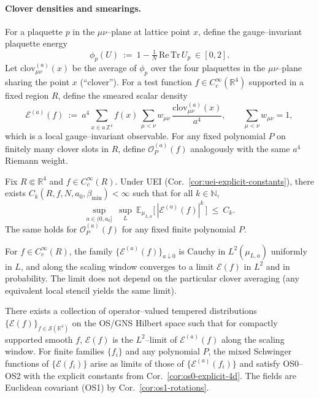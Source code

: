 \documentclass[11pt]{amsart}
\begin{document}
\paragraph{Clover densities and smearings.}
For a plaquette $p$ in the $\mu\nu$--plane at lattice point $x$, define the gauge--invariant plaquette energy
\[
  \phi_p(U)\ :=\ 1-\tfrac{1}{N}\,\mathrm{Re\,Tr}\,U_p\ \in[0,2].
\]
Let $\mathrm{clov}_{\mu\nu}^{(a)}(x)$ be the average of $\phi_p$ over the four plaquettes in the $\mu\nu$--plane sharing the point $x$ (``clover''). For a test function $f\in C_c^\infty(\mathbb R^4)$ supported in a fixed region $R$, define the smeared scalar density
\[
  \mathcal E^{(a)}(f)\ :=\ a^4 \sum_{x\in a\,\mathbb Z^4} f(x)\,\sum_{\mu<\nu} w_{\mu\nu}\,\frac{\mathrm{clov}_{\mu\nu}^{(a)}(x)}{a^4},\qquad \sum_{\mu<\nu} w_{\mu\nu}=1,
\]
which is a local gauge--invariant observable. For any fixed polynomial $P$ on finitely many clover slots in $R$, define $\mathcal O_P^{(a)}(f)$ analogously with the same $a^4$ Riemann weight.

\begin{lemma}\label{lem:clover-moment-bounds}
Fix $R\Subset \mathbb R^4$ and $f\in C_c^\infty(R)$. Under UEI (Cor.~\ref{cor:uei-explicit-constants}), there exists $C_{k}(R,f,N,a_0,\beta_{\min})<\infty$ such that for all $k\in\mathbb N$,
\[
  \sup_{a\in(0,a_0]}\ \sup_L\ \mathbb E_{\mu_{L,a}}\big[\,|\mathcal E^{(a)}(f)|^k\,\big]\ \le\ C_k.
\]
The same holds for $\mathcal O_P^{(a)}(f)$ for any fixed finite polynomial $P$.
\end{lemma}

\begin{lemma}\label{lem:clover-cauchy}
For $f\in C_c^\infty(R)$, the family $\{\mathcal E^{(a)}(f)\}_{a\downarrow 0}$ is Cauchy in $L^2(\mu_{L,a})$ uniformly in $L$, and along the scaling window converges to a limit $\mathcal E(f)$ in $L^2$ and in probability. The limit does not depend on the particular clover averaging (any equivalent local stencil yields the same limit).
\end{lemma}

\begin{theorem}\label{thm:local-fields-exist}
There exists a collection of operator--valued tempered distributions $\{\mathcal E(f)\}_{f\in \mathcal S(\mathbb R^4)}$ on the OS/GNS Hilbert space such that for compactly supported smooth $f$, $\mathcal E(f)$ is the $L^2$--limit of $\mathcal E^{(a)}(f)$ along the scaling window. For finite families $\{f_i\}$ and any polynomial $P$, the mixed Schwinger functions of $\{\mathcal E(f_i)\}$ arise as limits of those of $\{\mathcal E^{(a)}(f_i)\}$ and satisfy OS0--OS2 with the explicit constants from Cor.~\ref{cor:os0-explicit-4d}. The fields are Euclidean covariant (OS1) by Cor.~\ref{cor:os1-rotations}.
\end{theorem}
\end{document}

